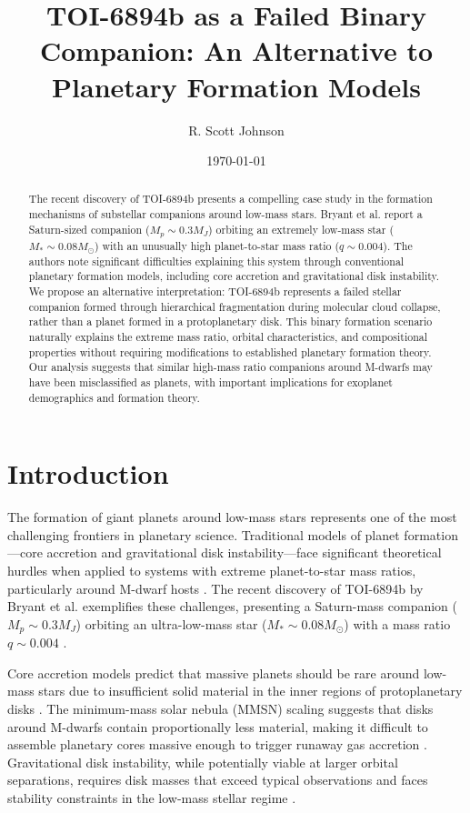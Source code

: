 \documentclass[12pt]{article}
\title{TOI-6894b as a Failed Binary Companion: An Alternative to Planetary Formation Models}
\author{R. Scott Johnson}
\affil{Independent Researcher \\ \texttt{orgwolf@proton.me}}
\date{\today}
\begin{document}
\maketitle

\begin{abstract}
The recent discovery of TOI-6894b presents a compelling case study in the formation mechanisms of substellar companions around low-mass stars. Bryant et al. report a Saturn-sized companion ($M_p \sim 0.3 M_J$) orbiting an extremely low-mass star ($M_* \sim 0.08 M_{\odot}$) with an unusually high planet-to-star mass ratio ($q \sim 0.004$). The authors note significant difficulties explaining this system through conventional planetary formation models, including core accretion and gravitational disk instability. We propose an alternative interpretation: TOI-6894b represents a failed stellar companion formed through hierarchical fragmentation during molecular cloud collapse, rather than a planet formed in a protoplanetary disk. This binary formation scenario naturally explains the extreme mass ratio, orbital characteristics, and compositional properties without requiring modifications to established planetary formation theory. Our analysis suggests that similar high-mass ratio companions around M-dwarfs may have been misclassified as planets, with important implications for exoplanet demographics and formation theory.
\end{abstract}

\section{Introduction}

The formation of giant planets around low-mass stars represents one of the most challenging frontiers in planetary science. Traditional models of planet formation—core accretion and gravitational disk instability—face significant theoretical hurdles when applied to systems with extreme planet-to-star mass ratios, particularly around M-dwarf hosts \citep{laughlin2004formation, boss2006formation}. The recent discovery of TOI-6894b by Bryant et al. exemplifies these challenges, presenting a Saturn-mass companion ($M_p \sim 0.3 M_J$) orbiting an ultra-low-mass star ($M_* \sim 0.08 M_{\odot}$) with a mass ratio $q \sim 0.004$ \citep{bryant2025saturn}.

Core accretion models predict that massive planets should be rare around low-mass stars due to insufficient solid material in the inner regions of protoplanetary disks \citep{ida2004formation, kennedy2008disk}. The minimum-mass solar nebula (MMSN) scaling suggests that disks around M-dwarfs contain proportionally less material, making it difficult to assemble planetary cores massive enough to trigger runaway gas accretion \citep{andrews2013protoplanetary}. Gravitational disk instability, while potentially viable at larger orbital separations, requires disk masses that exceed typical observations and faces stability constraints in the low-mass stellar regime \citep{rafikov2005can, kratter2016gravitational}.
\end{document}
